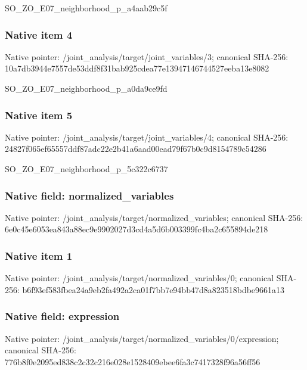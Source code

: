 \documentclass[10pt,a4paper]{article}
\begin{document}
\begingroup\raggedright\sloppy SO\_\allowbreak{}ZO\_\allowbreak{}E07\_\allowbreak{}neighborhood\_\allowbreak{}p\_\allowbreak{}a4aab29c5f\par\endgroup

\subsubsection{Native item 4}
Native pointer: /joint\_\allowbreak{}analysis/target/joint\_\allowbreak{}variables/3; canonical SHA-256: 10a7db3944e7557de53ddf8f31bab925cdea77e13947146744527eeba13e8082

\begingroup\raggedright\sloppy SO\_\allowbreak{}ZO\_\allowbreak{}E07\_\allowbreak{}neighborhood\_\allowbreak{}p\_\allowbreak{}a0da9ce9fd\par\endgroup

\subsubsection{Native item 5}
Native pointer: /joint\_\allowbreak{}analysis/target/joint\_\allowbreak{}variables/4; canonical SHA-256: 24827f065ef65557ddf87adc22e2b41a6aad00ead79f67b0c9d8154789c54286

\begingroup\raggedright\sloppy SO\_\allowbreak{}ZO\_\allowbreak{}E07\_\allowbreak{}neighborhood\_\allowbreak{}p\_\allowbreak{}5c322c6737\par\endgroup

\subsubsection{Native field: normalized\_\allowbreak{}variables}
Native pointer: /joint\_\allowbreak{}analysis/target/normalized\_\allowbreak{}variables; canonical SHA-256: 6e0c45e6053ea843a88ec9e9902027d3cd4a5d6b003399fc4ba2c655894de218

\subsubsection{Native item 1}
Native pointer: /joint\_\allowbreak{}analysis/target/normalized\_\allowbreak{}variables/0; canonical SHA-256: b6f93ef583fbea24a9eb2fa492a2ca01f7bb7e94bb47d8a823518bdbe9661a13

\subsubsection{Native field: expression}
Native pointer: /joint\_\allowbreak{}analysis/target/normalized\_\allowbreak{}variables/0/expression; canonical SHA-256: 776b8f0e2095ed838c2c32c216e028e1528409ebee6fa3c7417328f96a56ff56
\end{document}
